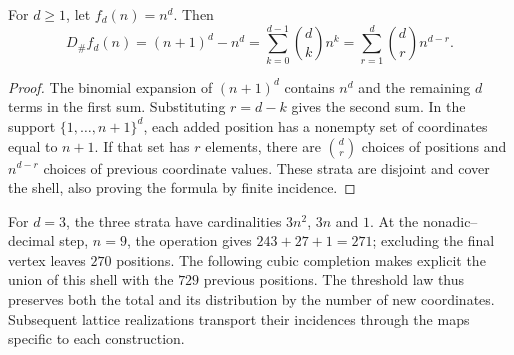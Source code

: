 \begin{proposition}
For \(d\geq1\), let \(f_d(n)=n^d\). Then
\begin{equation}
 D_\#f_d(n)=(n+1)^d-n^d
 =\sum_{k=0}^{d-1}\binom dk n^k
 =\sum_{r=1}^{d}\binom dr n^{d-r}.
 \label{mg07:binomio}
\end{equation}
\end{proposition}

\begin{proof}
The binomial expansion of \((n+1)^d\) contains \(n^d\) and the
remaining \(d\) terms in the first sum. Substituting \(r=d-k\)
gives the second sum. In the support \(\{1,\ldots,n+1\}^d\),
each added position has a nonempty set of coordinates equal to
\(n+1\). If that set has \(r\) elements, there are \(\binom dr\)
choices of positions and \(n^{d-r}\) choices of previous coordinate
values. These strata are disjoint and cover the shell, also proving
the formula by finite incidence.
\end{proof}

For \(d=3\), the three strata have cardinalities \(3n^2\),
\(3n\) and \(1\). At the nonadic--decimal step, \(n=9\), the
operation gives \(243+27+1=271\); excluding the final vertex leaves
\(270\) positions. The following cubic completion makes explicit
the union of this shell with the \(729\) previous positions. The
threshold law thus preserves both the total and its distribution by
the number of new coordinates. Subsequent lattice realizations
transport their incidences through the maps specific to each
construction.
